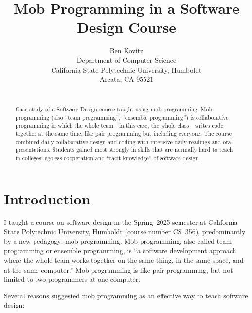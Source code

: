 \documentclass{article}
\title{Mob Programming in a Software Design Course}
\author{
Ben Kovitz \\
Department of Computer Science \\
California State Polytechnic University, Humboldt \\
Arcata, CA 95521 \\
\email{blk14@humboldt.edu}\\
}
\begin{document}
\maketitle

\begin{abstract}
Case study of a Software Design course taught using mob programming. Mob
programming (also ``team programming'', ``ensemble programming'') is
collaborative programming in which the whole team---in this case, the
whole class---writes code together at the same time, like pair programming
but including everyone. The course combined daily collaborative design and
coding with intensive daily readings and oral presentations. Students
gained most strongly in skills that are normally hard to teach in
colleges: egoless cooperation and ``tacit knowledge'' of software design.
\end{abstract}

\section{Introduction}
I taught a course on software design in the Spring~2025 semester at
California State Polytechnic University, Humboldt (course number CS~356),
predominantly by a new pedagogy: mob programming. Mob programming,
also called team programming or ensemble programming, is ``a software
development approach where the whole team works together on the same thing,
in the same space, and at the same computer.'' \cite{zuill2022software}
Mob programming is like pair programming, but not limited to two programmers
at one computer.

Several reasons suggested mob programming as an effective way to teach
software design:
\end{document}
